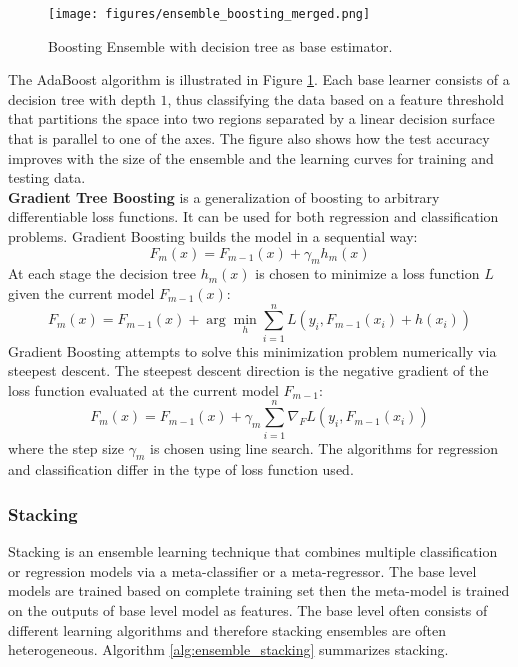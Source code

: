 \begin{figure}[tbhp]
    \centering
    \texttt{[image: figures/ensemble\_boosting\_merged.png]}
    \caption{Boosting Ensemble with decision tree as base estimator.}
    \label{fig:ensemble_boosting}
\end{figure}

The AdaBoost algorithm is illustrated in Figure \ref{fig:ensemble_boosting}. Each base learner consists of a decision tree with depth $1$, thus classifying the data based on a feature threshold that partitions the space into two regions separated by a linear decision surface that is parallel to one of the axes. The figure also shows how the test accuracy improves with the size of the ensemble and the learning curves for training and testing data.\\

\textbf{Gradient Tree Boosting} is a generalization of boosting to arbitrary differentiable loss functions. It can be used for both regression and classification problems. Gradient Boosting builds the model in a sequential way:
\begin{equation}
    F_m(x) = F_{m-1}(x) + \gamma_m h_m(x)
\end{equation}
At each stage the decision tree $h_m(x)$ is chosen to minimize a loss function $L$ given the current model $F_{m-1}(x)$:
\begin{equation}
    F_m(x) = F_{m-1}(x) + \arg \min_h \sum_{i=1}^{n} L(y_i, F_{m-1}(x_i) + h(x_i))
\end{equation}
Gradient Boosting attempts to solve this minimization problem numerically via steepest descent. The steepest descent direction is the negative gradient of the loss function evaluated at the current model $F_{m-1}$:
\begin{equation}
    F_m(x) = F_{m-1}(x) + \gamma_m \sum_{i=1}^{n} \nabla_F L(y_i, F_{m-1}(x_i))
\end{equation}
where the step size $\gamma_m$ is chosen using line search. The algorithms for regression and classification differ in the type of loss function used.


\subsubsection{Stacking}

Stacking is an ensemble learning technique that combines multiple classification or regression models via a meta-classifier or a meta-regressor. The base level models are trained based on complete training set then the meta-model is trained on the outputs of base level model as features. The base level often consists of different learning algorithms and therefore stacking ensembles are often heterogeneous. Algorithm \ref{alg:ensemble_stacking} summarizes stacking. 

